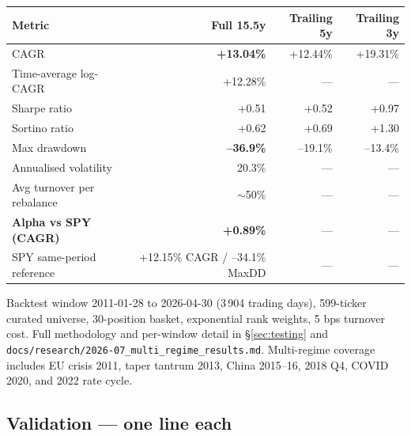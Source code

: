 \documentclass[11pt,a4paper]{article}
\begin{document}
\begin{table}[H]
\centering
\renewcommand{\arraystretch}{1.4}
\setlength{\arrayrulewidth}{1pt}
\begin{tabular}{|l|r|r|r|}
\hline
\rowcolor{black!10}
\textbf{Metric} & \textbf{Full 15.5y} & \textbf{Trailing 5y} & \textbf{Trailing 3y} \\
\hline
CAGR & \textbf{+13.04\%} & +12.44\% & +19.31\% \\
Time-average log-CAGR & +12.28\% & --- & --- \\
Sharpe ratio & +0.51 & +0.52 & +0.97 \\
Sortino ratio & +0.62 & +0.69 & +1.30 \\
Max drawdown & \textbf{--36.9\%} & --19.1\% & --13.4\% \\
Annualised volatility & 20.3\% & --- & --- \\
Avg turnover per rebalance & $\sim$50\% & --- & --- \\
\hline
\rowcolor{black!5}
\textbf{Alpha vs SPY (CAGR)} & \textbf{+0.89\%} & --- & --- \\
\rowcolor{black!5}
SPY same-period reference & +12.15\% CAGR / --34.1\% MaxDD & --- & --- \\
\hline
\end{tabular}
\end{table}

Backtest window 2011-01-28 to 2026-04-30 (3\,904 trading days), 599-ticker curated universe, 30-position basket, exponential rank weights, 5 bps turnover cost. Full methodology and per-window detail in \S\ref{sec:testing} and \texttt{docs/research/2026-07\_multi\_regime\_results.md}. Multi-regime coverage includes EU crisis 2011, taper tantrum 2013, China 2015--16, 2018 Q4, COVID 2020, and 2022 rate cycle.

\subsection{Validation --- one line each}
\end{document}
